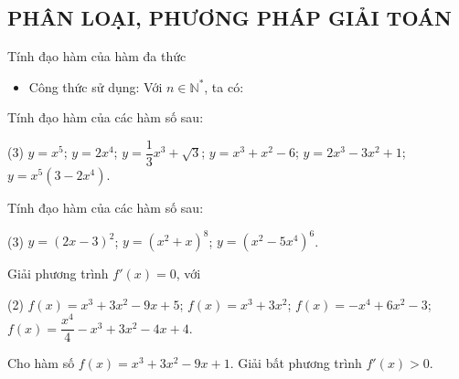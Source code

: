 \subsection{PHÂN LOẠI, PHƯƠNG PHÁP GIẢI TOÁN}
\begin{dang}{Tính đạo hàm của hàm đa thức}
	\begin{itemize}
		\item [\iconCH] Công thức sử dụng: Với $n \in \mathbb{N}^*$, ta có:
	\end{itemize}
\end{dang}

\begin{vd}
	Tính đạo hàm của các hàm số sau:
	\begin{tasks}(3)
		\task $y=x^5$;
		\task $y=2x^4$;
		\task $y=\dfrac{1}{3}x^3+\sqrt{3}$;
		\task $y=x^3+x^2-6$;
		\task $y=2x^3-3x^2+1$;
		\task $y=x^5(3-2x^4)$.
	\end{tasks}
\end{vd} 

\begin{vd}
	Tính đạo hàm của các hàm số sau:
	\begin{tasks}(3)
		\task $y=(2x-3)^2$;
		\task $y=(x^2+x)^8$;
		\task $y=(x^2-5x^4)^6$.
	\end{tasks}
\end{vd} 

\begin{vd}
	Giải phương trình $f'(x)=0$, với
	\begin{tasks}(2)
		\task $f(x)=x^3+3x^2-9x+5$;
		\task $f(x)=x^3+3x^2$;
		\task $f(x)=-x^4+6x^2-3$;
		\task $f(x)=\dfrac{x^4}{4}-x^3+3x^2-4x+4$.
	\end{tasks}
\loigiai{
	\begin{enumerate}[a)]
		\item
		\item
		\item
		\item
\end{enumerate}}
\end{vd} 

\begin{vd}
	Cho hàm số $f(x)=x^{3}+3x^{2}-9x+1$. Giải bất phương trình $f'(x)>0$.
\end{vd} 

